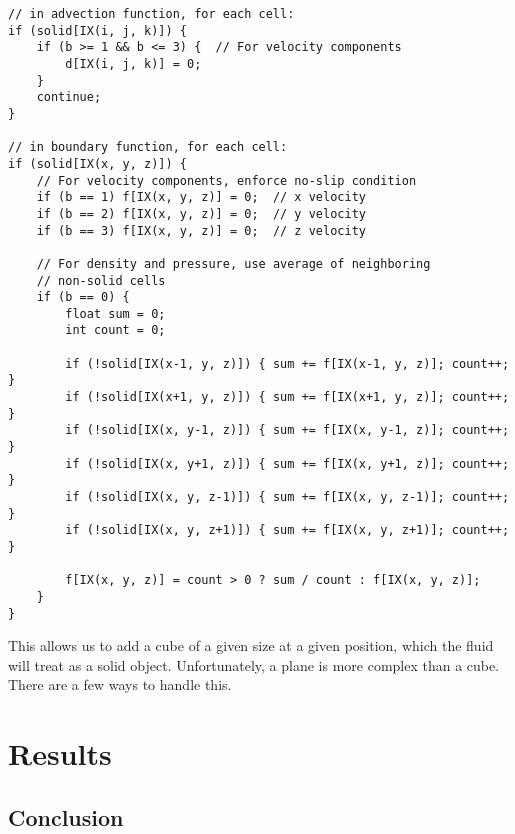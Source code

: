 \documentclass[a4paper,12pt]{article}
\begin{document}
\begin{lstlisting}
// in advection function, for each cell:
if (solid[IX(i, j, k)]) {
	if (b >= 1 && b <= 3) {  // For velocity components
		d[IX(i, j, k)] = 0;
	}
	continue;
}

// in boundary function, for each cell:
if (solid[IX(x, y, z)]) {
	// For velocity components, enforce no-slip condition
	if (b == 1) f[IX(x, y, z)] = 0;  // x velocity
	if (b == 2) f[IX(x, y, z)] = 0;  // y velocity
	if (b == 3) f[IX(x, y, z)] = 0;  // z velocity

	// For density and pressure, use average of neighboring
	// non-solid cells
	if (b == 0) {
		float sum = 0;
		int count = 0;

		if (!solid[IX(x-1, y, z)]) { sum += f[IX(x-1, y, z)]; count++; }
		if (!solid[IX(x+1, y, z)]) { sum += f[IX(x+1, y, z)]; count++; }
		if (!solid[IX(x, y-1, z)]) { sum += f[IX(x, y-1, z)]; count++; }
		if (!solid[IX(x, y+1, z)]) { sum += f[IX(x, y+1, z)]; count++; }
		if (!solid[IX(x, y, z-1)]) { sum += f[IX(x, y, z-1)]; count++; }
		if (!solid[IX(x, y, z+1)]) { sum += f[IX(x, y, z+1)]; count++; }

		f[IX(x, y, z)] = count > 0 ? sum / count : f[IX(x, y, z)];
	}
}
\end{lstlisting}

This allows us to add a cube of a given size at a given position, which the
fluid will treat as a solid object. Unfortunately, a plane is more complex than
a cube. There are a few ways to handle this.

\section{Results}
\ipsum[1]

\subsection{Conclusion}
\ipsum[1]

\nocite{*}
\printbibliography
\end{document}
